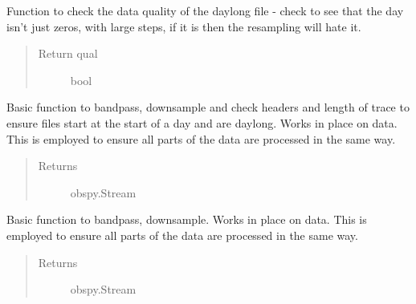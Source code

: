 \documentclass[a4paper,10pt,english]{sphinxmanual}
\begin{document}
\begin{fulllineitems}
\label{utils:pre_processing._check_daylong}
Function to check the data quality of the daylong file - check to see that
the day isn't just zeros, with large steps, if it is then the resampling will
hate it.
\begin{quote}\begin{description}
\item[{Return qual}] \leavevmode
bool

\end{description}\end{quote}

\end{fulllineitems}


\begin{fulllineitems}
\label{utils:pre_processing.dayproc}
Basic function to bandpass, downsample and check headers and length of trace
to ensure files start at the start of a day and are daylong.  Works in place
on data.  This is employed to ensure all parts of the data are processed
in the same way.
\begin{quote}\begin{description}
\item[{Returns}] \leavevmode
obspy.Stream

\end{description}\end{quote}

\end{fulllineitems}


\begin{fulllineitems}
\label{utils:pre_processing.shortproc}
Basic function to bandpass, downsample.  Works in place
on data.  This is employed to ensure all parts of the data are processed
in the same way.
\begin{quote}\begin{description}
\item[{Returns}] \leavevmode
obspy.Stream

\end{description}\end{quote}

\end{fulllineitems}
\end{document}
